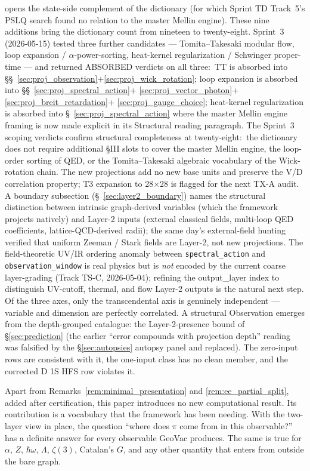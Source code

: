\documentclass[11pt]{article}
\begin{document}
opens the state-side complement of the dictionary (for which Sprint TD
Track~5's PSLQ search found no relation to the master Mellin engine).  These nine additions bring the dictionary
count from nineteen to twenty-eight.  Sprint~3 (2026-05-15) tested
three further candidates --- Tomita--Takesaki modular flow, loop
expansion / $\alpha$-power-sorting, heat-kernel regularization / Schwinger
proper-time --- and returned ABSORBED verdicts on all three:\ TT is
absorbed into \S\S~\ref{sec:proj_observation}+\ref{sec:proj_wick_rotation};
loop expansion is absorbed into \S\S~\ref{sec:proj_spectral_action}+%
\ref{sec:proj_vector_photon}+\ref{sec:proj_breit_retardation}+%
\ref{sec:proj_gauge_choice}; heat-kernel regularization is absorbed
into \S~\ref{sec:proj_spectral_action} where the master Mellin engine
framing is now made explicit in its Structural reading paragraph.  The
Sprint~3 scoping verdicts confirm structural completeness at twenty-eight:\
the dictionary does not require additional §III slots to cover the master
Mellin engine, the loop-order sorting of QED, or the Tomita--Takesaki
algebraic vocabulary of the Wick-rotation chain.  The new projections
add no new base units and preserve the V/D correlation property; T3
expansion to 28$\times$28 is flagged for the next TX-A audit.  A boundary subsection
(\S~\ref{sec:layer2_boundary}) names the structural distinction
between intrinsic graph-derived variables (which the framework
projects natively) and Layer-2 inputs (external classical fields,
multi-loop QED coefficients, lattice-QCD-derived radii); the same
day's external-field hunting verified that uniform Zeeman / Stark
fields are Layer-2, not new projections.  The
field-theoretic UV/IR ordering anomaly between \texttt{spectral\_action}
and \texttt{observation\_window} is real physics but is \emph{not}
encoded by the current coarse layer-grading (Track TS-C, 2026-05-04);
refining the output\_layer index to distinguish UV-cutoff, thermal,
and flow Layer-2 outputs is the natural next step.  Of the three axes, only the
transcendental axis is genuinely independent --- variable and
dimension are perfectly correlated.  A structural Observation
emerges from the depth-grouped catalogue: the Layer-2-presence bound
of \S\ref{sec:prediction} (the earlier ``error compounds with
projection depth'' reading was falsified by the
\S\ref{sec:autopsies} autopsy panel and replaced).  The zero-input
rows are consistent with it, the one-input class has no clean member,
and the corrected D 1S HFS row violates it.

Apart from Remarks~\ref{rem:minimal_presentation} and
\ref{rem:ee_partial_split}, added after certification, this paper
introduces no new computational result.  Its contribution
is a vocabulary that the framework has been needing.  With the
two-layer view in place, the question ``where does $\pi$ come from
in this observable?'' has a definite answer for every observable
GeoVac produces.  The same is true for $\alpha$, $Z$, $\hbar\omega$,
$\Lambda$, $\zeta(3)$, Catalan's $G$, and any other quantity that
enters from outside the bare graph.
\end{document}
